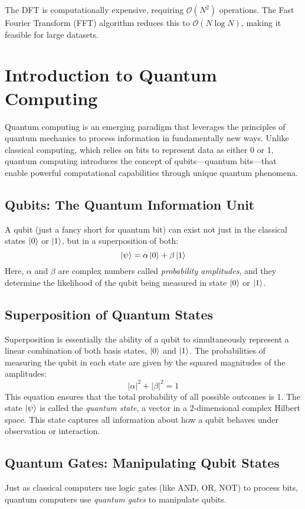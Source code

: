 \documentclass{article}
\begin{document}
The DFT is computationally expensive, requiring $\mathcal{O}(N^2)$ operations. The Fast Fourier Transform (FFT) algorithm reduces this to $\mathcal{O}(N \log N)$, making it feasible for large datasets.

\section{Introduction to Quantum Computing}
Quantum computing is an emerging paradigm that leverages the principles of quantum mechanics to process information in fundamentally new ways. Unlike classical computing, which relies on bits to represent data as either 0 or 1, quantum computing introduces the concept of qubits---quantum bits---that enable powerful computational capabilities through unique quantum phenomena.

\subsection{Qubits: The Quantum Information Unit}
A qubit (just a fancy short for quantum bit) can exist not just in the classical states $\ket{0}$ or $\ket{1}$, but in a superposition of both:
\[
    \ket{\psi} = \alpha \ket{0} + \beta \ket{1}
\]
Here, $\alpha$ and $\beta$ are complex numbers called \emph{probability amplitudes}, and they determine the likelihood of the qubit being measured in state $\ket{0}$ or $\ket{1}$.

\subsection{Superposition of Quantum States}
Superposition is essentially the ability of a qubit to simultaneously represent a linear combination of both basis states, $\ket{0}$ and $\ket{1}$. The probabilities of measuring the qubit in each state are given by the squared magnitudes of the amplitudes:
\[
    |\alpha|^2 + |\beta|^2 = 1
\]
This equation ensures that the total probability of all possible outcomes is 1. The state $\ket{\psi}$ is called the \emph{quantum state}, a vector in a 2-dimensional complex Hilbert space. This state captures all information about how a qubit behaves under observation or interaction.

\subsection{Quantum Gates: Manipulating Qubit States}
Just as classical computers use logic gates (like AND, OR, NOT) to process bits, quantum computers use \emph{quantum gates} to manipulate qubits.
\end{document}
